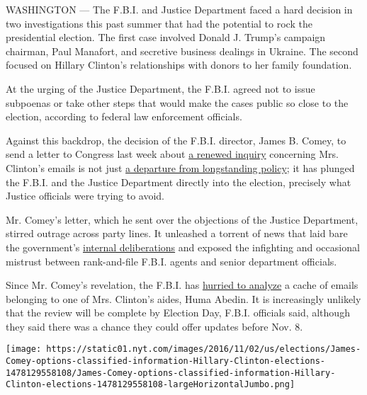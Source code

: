 WASHINGTON --- The F.B.I. and Justice Department faced a hard decision
in two investigations this past summer that had the potential to rock
the presidential election. The first case involved Donald J. Trump's
campaign chairman, Paul Manafort, and secretive business dealings in
Ukraine. The second focused on Hillary Clinton's relationships with
donors to her family foundation.

At the urging of the Justice Department, the F.B.I. agreed not to issue
subpoenas or take other steps that would make the cases public so close
to the election, according to federal law enforcement officials.

Against this backdrop, the decision of the F.B.I. director, James B.
Comey, to send a letter to Congress last week about
\href{http://www.nytimes.com/2016/10/29/us/politics/fbi-hillary-clinton-email.html}{a
renewed inquiry} concerning Mrs. Clinton's emails is not just
\href{http://www.nytimes.com/2016/10/30/us/politics/comey-clinton-email-justice.html}{a
departure from longstanding policy}; it has plunged the F.B.I. and the
Justice Department directly into the election, precisely what Justice
officials were trying to avoid.

Mr. Comey's letter, which he sent over the objections of the Justice
Department, stirred outrage across party lines. It unleashed a torrent
of news that laid bare the government's
\href{http://www.wsj.com/articles/laptop-may-include-thousands-of-emails-linked-to-hillary-clintons-private-server-1477854957}{internal
deliberations} and exposed the infighting and occasional mistrust
between rank-and-file F.B.I. agents and senior department officials.

Since Mr. Comey's revelation, the F.B.I. has
\href{http://www.nytimes.com/2016/11/01/us/politics/hillary-clinton-huma-abedin-emails-fbi.html}{hurried
to analyze} a cache of emails belonging to one of Mrs. Clinton's aides,
Huma Abedin. It is increasingly unlikely that the review will be
complete by Election Day, F.B.I. officials said, although they said
there was a chance they could offer updates before Nov. 8.

\href{https://www.nytimes.com/interactive/2016/11/02/us/elections/James-Comey-options-classified-information-Hillary-Clinton-elections.html}{}

\texttt{[image: https://static01.nyt.com/images/2016/11/02/us/elections/James-Comey-options-classified-information-Hillary-Clinton-elections-1478129558108/James-Comey-options-classified-information-Hillary-Clinton-elections-1478129558108-largeHorizontalJumbo.png]}

